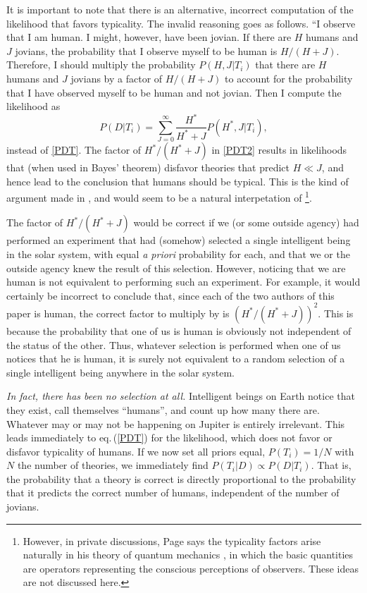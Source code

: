 \documentclass[pra,twocolumn,nofootinbib,eqsecnum,floatfix]{revtex4}
\def\eq#1{eq.$\,$(\ref{#1})}
\begin{document}
It is important to note that there is an alternative, incorrect computation of the likelihood that 
favors typicality.   The invalid reasoning goes as follows.  ``I observe that I am human.  
I might, however, have been jovian.
If there are $H$ humans and $J$ jovians, the probability that I observe myself to be human
is $H/(H+J)$.  Therefore, I should multiply the probability $P(H,J|T_i)$ that there are 
$H$ humans and $J$ jovians by a factor of
${H}/({H}+J)$ to account for the probability that I have observed myself to be human and not
jovian.  Then I compute the likelihood as
\begin{equation}
P(D|T_i) = \sum_{J=0}^\infty \frac{H^*}{H^*+J} P({H^*},J|T_i),
\label{PDT2}
\end{equation} 
instead of \eqref{PDT}.
The factor of ${H^*}/({H^*}+J)$ in \eqref{PDT2} results in likelihoods that 
(when used in Bayes' theorem) disfavor theories that predict $H \ll J$,
and hence lead to the conclusion that humans should be typical. This is the kind of argument made in \cite{DKS02,BF06}, and would seem to be a natural interpetation of
\cite{Page06a,Page06b,Page06c,Page06d}\footnote{However, in private discussions, 
Page says the typicality factors arise naturally in his theory of quantum mechanics \cite{Pageqm},
in which the basic quantities are operators representing the conscious perceptions of observers.  These ideas are not discussed here.}. 

The factor of $H^*/(H^*+J)$ would be correct if we (or some outside agency) 
had performed an experiment that had (somehow) selected a single intelligent being in the 
solar system, with equal {\it a priori\/}
probability for each, and that we or the outside agency  knew the result of this selection. 
However, noticing that we are human is not equivalent to performing such an experiment.  
For example,
it would certainly be incorrect to conclude that, since each of the two authors of this paper
is human, the correct factor to multiply by is $({H^*}/({H^*}+J))^2$.  This is because the 
probability that one of us is human is obviously not independent of the status of the other.
Thus, whatever selection is performed when one of us notices that he is human,
it is surely not equivalent to a random selection of a single intelligent being anywhere 
in the solar system.  

{\it  In fact, there has been no selection at all.  }
Intelligent beings on Earth notice that they exist, call themselves ``humans'', 
and count up how many there are.  Whatever may
or may not be happening on Jupiter is entirely irrelevant.
This leads immediately to \eq{PDT} for the likelihood, which does not 
favor or disfavor typicality of humans.  
If we now set all priors equal, $P(T_i)=1/N$ with
$N$ the number of theories, we immediately find $P(T_i|D) \propto P(D|T_i)$.
That is, the probability that a theory is correct is directly proportional to the probability
that it predicts the correct number of humans, independent of the number of jovians.
\end{document}
